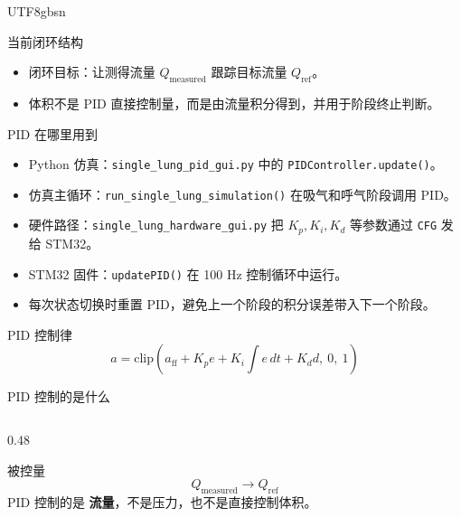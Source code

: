 \documentclass[aspectratio=169,10pt]{beamer}
\newcommand{\code}[1]{\texttt{\small #1}}
\newcommand{\highlight}[1]{\textcolor{lungblue}{\textbf{#1}}}
\begin{document}
\begin{CJK*}{UTF8}{gbsn}
\begin{frame}{当前闭环结构}

  \vspace{1.0em}
  \begin{itemize}
    \item 闭环目标：让测得流量 $Q_{\mathrm{measured}}$ 跟踪目标流量 $Q_{\mathrm{ref}}$。
    \item 体积不是 PID 直接控制量，而是由流量积分得到，并用于阶段终止判断。
  \end{itemize}
\end{frame}

\begin{frame}{PID 在哪里用到}
  \begin{itemize}
    \item Python 仿真：\code{single\_lung\_pid\_gui.py} 中的 \code{PIDController.update()}。
    \item 仿真主循环：\code{run\_single\_lung\_simulation()} 在吸气和呼气阶段调用 PID。
    \item 硬件路径：\code{single\_lung\_hardware\_gui.py} 把 $K_p,K_i,K_d$ 等参数通过 \code{CFG} 发给 STM32。
    \item STM32 固件：\code{updatePID()} 在 100 Hz 控制循环中运行。
    \item 每次状态切换时重置 PID，避免上一个阶段的积分误差带入下一个阶段。
  \end{itemize}

  \vspace{0.4em}
  \begin{block}{PID 控制律}
    \[
      a=\mathrm{clip}\left(
      a_{\mathrm{ff}}+K_p e+K_i\int e\,dt+K_d d,\ 0,\ 1
      \right)
    \]
  \end{block}
\end{frame}

\begin{frame}{PID 控制的是什么}
  \begin{columns}[T,onlytextwidth]
    \begin{column}{0.48\textwidth}
      \begin{block}{被控量}
        \[
          Q_{\mathrm{measured}}\rightarrow Q_{\mathrm{ref}}
        \]
        PID 控制的是 \highlight{流量}，不是压力，也不是直接控制体积。
      \end{block}


\end{column}
\end{columns}
\end{frame}
\end{CJK*}
\end{document}
